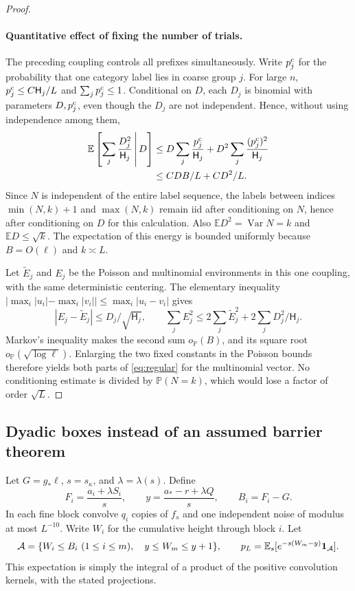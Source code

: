 \documentclass[11pt]{article}
\theoremstyle{definition}\newtheorem{definition}[theorem]{Definition}
\theoremstyle{remark}\newtheorem{remark}[theorem]{Remark}
\newcommand{\E}{\mathbb E}\newcommand{\Pp}{\mathbb P}
\newcommand{\Var}{\operatorname{Var}}\newcommand{\Poi}{\operatorname{Poi}}
\numberwithin{equation}{section}\allowdisplaybreaks
\begin{document}
\begin{proof}
\paragraph{Quantitative effect of fixing the number of trials.}
The preceding coupling controls all prefixes simultaneously.
Write $p_j^{\rm c}$ for the probability that one category label
lies in coarse group $j$. For large $n$,
$p_j^{\rm c}\le C\mathsf H_j/L$ and
$\sum_jp_j^{\rm c}\le1$. Conditional on $D$, each $D_j$ is
binomial with parameters $D,p_j^{\rm c}$, even though the $D_j$
are not independent. Hence, without using independence among them,
\[
 \begin{split}
 \E\left[\sum_j\frac{D_j^2}{\mathsf H_j}\,\middle|\,D\right]
 &\le D\sum_j\frac{p_j^{\rm c}}{\mathsf H_j}
       +D^2\sum_j\frac{(p_j^{\rm c})^2}{\mathsf H_j}\\
 &\le CDB/L+CD^2/L.
 \end{split}
\]
Since $N$ is independent of the entire label sequence, the labels
between indices $\min(N,k)+1$ and $\max(N,k)$ remain iid after
conditioning on $N$, hence after conditioning on $D$ for this
calculation. Also $\E D^2=\Var N=k$ and
$\E D\le\sqrt{k}$. The expectation of this energy is bounded
uniformly because $B=O(\ell)$ and $k\asymp L$.

Let $\widetilde E_j$ and $E_j$ be the Poisson and multinomial
environments in this one coupling, with the same deterministic
centering. The elementary inequality
$|\max_i|u_i|-\max_i|v_i||\le\max_i|u_i-v_i|$ gives
\[
 |E_j-\widetilde E_j|\le D_j/\sqrt{\mathsf H_j},
 \qquad
 \sum_j E_j^2\le2\sum_j\widetilde E_j^2
                         +2\sum_jD_j^2/\mathsf H_j.
\]
Markov's inequality makes the second sum $o_{\Pp}(B)$, and its
square root $o_{\Pp}(\sqrt{\log\ell})$. Enlarging the two fixed
constants in the Poisson bounds therefore yields both parts of
\eqref{eq:regular} for the multinomial vector. No conditioning
estimate is divided by $\Pp(N=k)$, which would lose a factor
of order $\sqrt L$.

\end{proof}

\subsection{Dyadic boxes instead of an assumed barrier theorem}
Let $G=g_*\ell$, $s=s_\kappa$, and $\lambda=\lambda(s)$. Define
\begin{equation}\label{eq:frontier}
 F_i=\frac{a_i+\lambda S_i}{s},\qquad
 y=\frac{a_*-r+\lambda Q}{s},\qquad B_i=F_i-G.
\end{equation}
In each fine block convolve $q_i$ copies of $f_s$ and one independent
noise of modulus at most $L^{-10}$. Write $W_i$ for the cumulative height
through block $i$. Let
\begin{equation}\label{eq:path-weight}
 \mathcal A=\{W_i\le B_i\ (1\le i\le m),\quad y\le W_m\le y+1\},
 \qquad
 p_L=\E_s[e^{-s(W_m-y)}\ind_{\mathcal A}].
\end{equation}
This expectation is simply the integral of a product of the positive
convolution kernels, with the stated projections.
\end{document}
